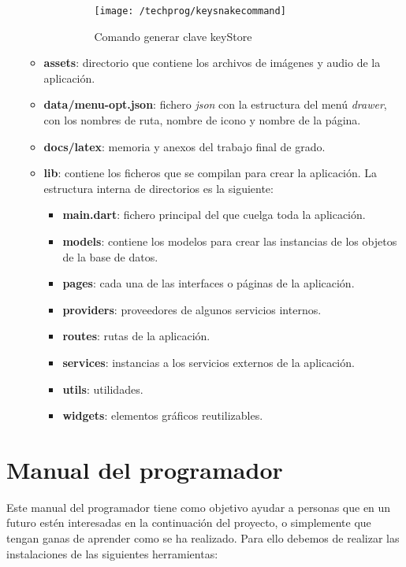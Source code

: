 \begin{itemize}
\begin{itemize}
\begin{itemize}
		\begin{figure}[H]
			\centering
			\texttt{[image: /techprog/keysnakecommand]}
			\caption{Comando generar clave keyStore}
			\label{fig:commandkey}
		\end{figure}	 
	\end{itemize}
	\item \textbf{assets}: directorio que contiene los archivos de imágenes y audio de la aplicación. 
	\item \textbf{data/menu-opt.json}: fichero \emph{json} con la estructura del menú \emph{drawer}, con los nombres de ruta, nombre de icono y nombre de la página. 
	\item \textbf{docs/latex}: memoria y anexos del trabajo final de grado.
	\item \textbf{lib}: contiene los ficheros que se compilan para crear la aplicación. La estructura interna de directorios es la siguiente:
	\begin{itemize}
		\item \textbf{main.dart}: fichero principal del que cuelga toda la aplicación.
		\item \textbf{models}: contiene los modelos para crear las instancias de los objetos de la base de datos.
		\item \textbf{pages}: cada una de las interfaces o páginas de la aplicación.
		\item \textbf{providers}: proveedores de algunos servicios internos.
		\item \textbf{routes}: rutas de la aplicación.
		\item \textbf{services}: instancias a los servicios externos de la aplicación.
		\item \textbf{utils}: utilidades.
		\item \textbf{widgets}: elementos gráficos reutilizables.
		 
	\end{itemize}
\end{itemize}
\end{itemize}

\section{Manual del programador}
Este manual del programador tiene como objetivo ayudar a personas que en un futuro estén interesadas en la continuación del proyecto, o simplemente que tengan ganas de aprender como se ha realizado. Para ello debemos de realizar las instalaciones de las siguientes herramientas:

